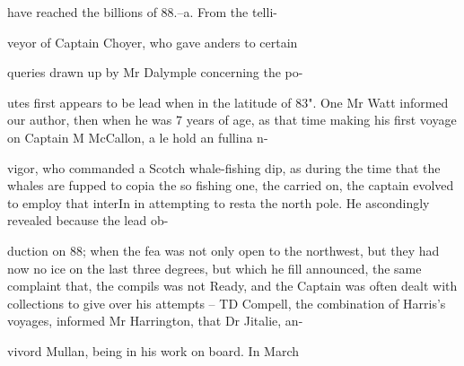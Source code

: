 \documentclass{article}
\begin{document}
have reached the billions of 88.--a. From the telli-

veyor of Captain Choyer, who gave anders to certain

queries drawn up by Mr Dalymple concerning the po-

utes first appears to be lead when in the latitude of 83". One Mr Watt informed our author, then when he was 7 years of age, as that time making his first voyage on Captain M McCallon, a le hold an fullina n-

vigor, who commanded a Scotch whale-fishing dip, as during the time that the whales are fupped to copia the so fishing one, the carried on, the captain evolved to employ that interIn in attempting to resta the north pole. He ascondingly revealed because the lead ob-

duction on 88; when the fea was not only open to the northwest, but they had now no ice on the last three degrees, but which he fill announced, the same complaint that, the compils was not Ready, and the Captain was often dealt with collections to give over his attempts – TD Compell, the combination of Harris’s voyages, informed Mr Harrington, that Dr Jitalie, an-

vivord Mullan, being in his work on board. In March
\end{document}
